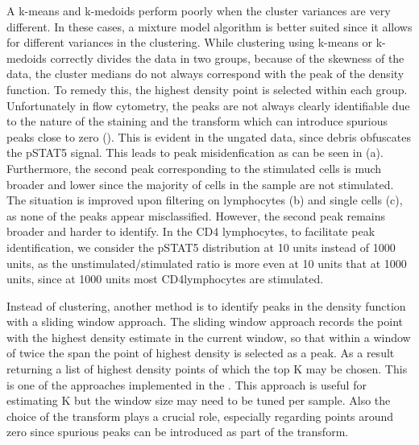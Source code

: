 A k-means and k-medoids perform poorly when the cluster variances are very different.
In these cases, a mixture model algorithm is better suited since it allows for different variances in the clustering.
While clustering using k-means or k-medoids correctly divides the data in two groups, because of the skewness of the data, the cluster medians
do not always correspond with the peak of the density function.  To remedy this, the highest density point is selected within each group.
Unfortunately in flow cytometry, the peaks are not always clearly identifiable due to the nature of the staining and the transform which can introduce
spurious peaks close to zero ().
This is evident in the ungated data, since debris obfuscates the pSTAT5 signal.
This leads to peak misidenfication as can be seen in (a).
Furthermore, the second peak corresponding to the stimulated cells is much broader and lower since the majority of cells in the sample are not stimulated.
The situation is improved upon filtering on lymphocytes (b) and single cells (c), as none of the peaks appear misclassified.
However, the second peak remains broader and harder to identify.
In the CD4 lymphocytes, to facilitate peak identification, we consider the pSTAT5 distribution at 10 units instead of 1000 units,
as the unstimulated/stimulated ratio is more even at 10 units that at 1000 units, since at 1000 units most CD4\positive lymphocytes are stimulated.

Instead of clustering, another method is to identify peaks in the density function with a sliding window approach.
The sliding window approach records the point with the highest density estimate in the current window, so that within a window of twice the span
the point of highest density is selected as a peak.
As a result returning a list of highest density points of which the top K may be chosen.
This is one of the approaches implemented in the .
This approach is useful for estimating K but the window size may need to be tuned per sample.
Also the choice of the transform plays a crucial role, especially regarding points around zero since spurious peaks can be introduced as part of the transform.


